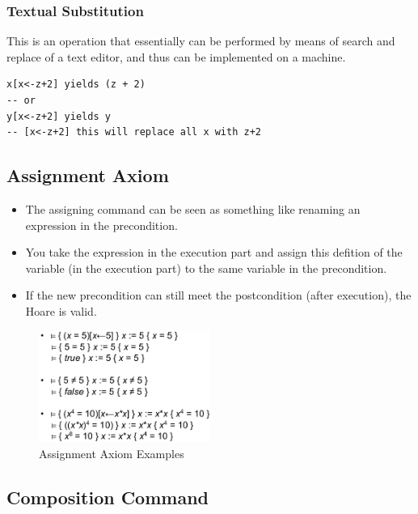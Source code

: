 \hypertarget{textual-substitution}{%
\subsubsection{Textual Substitution}\label{textual-substitution}}

This is an operation that essentially can be performed by means of
search and replace of a text editor, and thus can be implemented on a
machine.

\begin{lstlisting}
x[x<-z+2] yields (z + 2)
-- or
y[x<-z+2] yields y
-- [x<-z+2] this will replace all x with z+2
\end{lstlisting}

\hypertarget{assignment-axiom}{%
\subsection{Assignment Axiom}\label{assignment-axiom}}

\begin{itemize}
\tightlist
\item
  The assigning command can be seen as something like renaming an
  expression in the precondition.
\item
  You take the expression in the execution part and assign this defition
  of the variable (in the execution part) to the same variable in the
  precondition.
\item
  If the new precondition can still meet the postcondition (after
  execution), the Hoare is valid.
\end{itemize}

\begin{figure}[H]
\centering
\includegraphics[width=0.5\textwidth]{figures/assigningAxiom.png}
\caption{Assignment Axiom Examples}
\end{figure}

\hypertarget{composition-command}{%
\subsection{Composition Command}\label{composition-command}}

